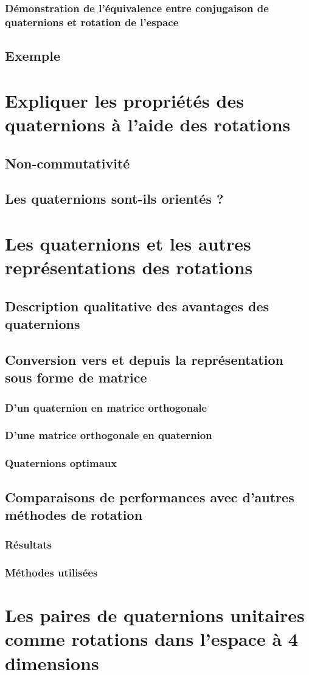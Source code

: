 		\subsubsection{Démonstration de l'équivalence entre conjugaison de quaternions et rotation de l'espace}
			
	\subsection{Exemple}
	
\section{Expliquer les propriétés des quaternions à l'aide des rotations}
	\subsection{Non-commutativité}
	\subsection{Les quaternions sont-ils orientés ?}
	
\section{Les quaternions et les autres représentations des rotations}
	\subsection{Description qualitative des avantages des quaternions}
	\subsection{Conversion vers et depuis la représentation sous forme de matrice}
		\subsubsection{D'un quaternion en matrice orthogonale}
		\subsubsection{D'une matrice orthogonale en quaternion}
		\subsubsection{Quaternions optimaux}
	\subsection{Comparaisons de performances avec d'autres méthodes de rotation}
		\subsubsection{Résultats}
		\subsubsection{Méthodes utilisées}
\section{Les paires de quaternions unitaires comme rotations dans l'espace à 4 dimensions}